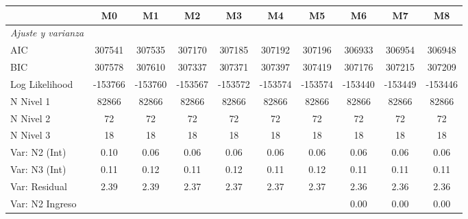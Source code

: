 \documentclass[12pt,letterpaper]{article}
\begin{document}
\begin{landscape}
	\begin{table}
		\begin{center}
	    \renewcommand{\arraystretch}{0.7}
			\begin{tabular}{l c{5} c{5} c{} c{} c{} c{} c{} c{} c{}}
				\hline
				& \multicolumn{1}{c}{\textbf{M0}} & \multicolumn{1}{c}{\textbf{M1}} & \multicolumn{1}{c}{\textbf{M2}} & \multicolumn{1}{c}{\textbf{M3}} & \multicolumn{1}{c}{\textbf{M4}} & \multicolumn{1}{c}{\textbf{M}} & \multicolumn{1}{c}{\textbf{M6}} & \multicolumn{1}{c}{\textbf{M7}} & \multicolumn{1}{c}{\textbf{M8}} \\ \hline
				\textit{Ajuste y varianza} &             &             &             &             &             &             &             &             &             \\
				AIC                                   & 30741  & 307535   & 307170   & 307185   & 307192  & 307196  & 306933   & 306954   & 306948   \\
				BIC                                   & 307578  & 307610   & 307337   & 307371   & 307397  & 307419  & 307176   & 307215   & 307209   \\
				Log Likelihood                       & -153766 & -153760  & -153567  & -153572  & -153574 & -153574 & -153440  & -153449  & -153446  \\
				N Nivel 1                            & 82866      & 82866       & 82866       & 82866       & 82866      & 82866      & 82866       & 82866       & 82866       \\
				N Nivel 2                & 72         & 72          & 72          & 72          & 72         & 72         & 72          & 72          & 72          \\
				N Nivel 3                    & 18         & 18          & 18          & 18          & 18         & 18         & 18          & 18          & 18          \\
				Var: N2 (Int)            & 0.10       & 0.06        & 0.06        & 0.06        & 0.06       & 0.06       & 0.06        & 0.06        & 0.06        \\
				Var: N3 (Int)                & 0.11       & 0.12        & 0.11        & 0.12        & 0.11       & 0.12       & 0.11        & 0.11        & 0.11        \\
				Var: Residual                        & 2.39       & 2.39        & 2.37        & 2.37        & 2.37       & 2.37       & 2.36        & 2.36        & 2.36        \\
				Var: N2 Ingreso             &            &             &             &             &            &            & 0.00        & 0.00        & 0.00        \\

\end{tabular}
\end{center}
\end{table}
\end{landscape}
\end{document}
